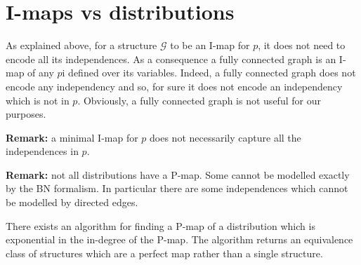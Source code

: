 \section{I-maps vs distributions}
As explained above, for a structure $\mathcal{G}$ to be an I-map for $p$, it does not need to encode all its independences. As a consequence a fully connected graph is an I-map of any $p$i defined over its variables. Indeed, a fully connected graph does not encode any independency and so, for sure it does not encode an independency which is not in $p$. Obviously, a fully connected graph is not useful for our purposes.


\textbf{Remark:} a minimal I-map for $p$ does not necessarily capture all the independences in $p$.


\textbf{Remark:} not all distributions have a P-map. Some cannot be modelled exactly by the BN formalism. In particular there are some independences which cannot be modelled by directed edges. \newline

There exists an algorithm for finding a P-map of a distribution which is exponential in the in-degree of the P-map. The algorithm returns an equivalence class of structures which are a perfect map rather than a single structure.

